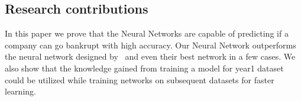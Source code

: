  


\subsection{Research contributions}

In this paper we prove that the Neural Networks are capable of predicting if a company can go bankrupt with high accuracy. Our Neural Network outperforms the neural network designed by~\cite{zikeba2016ensemble} and even their best network in a few cases. We also show that the knowledge gained from training a model for year1 dataset could be utilized while training networks on subsequent datasets for faster learning.

